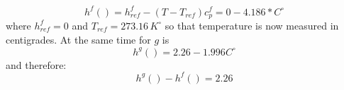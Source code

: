 \begin{equation}
h^f() = h^f_{ref} -(T-T_{ref})c_p^f = 0 - 4.186*  C^\circ   
\end{equation}
where \(h_{ref}^f=0\) and \(T_{ref} = 273.16\, K^\circ\) so that temperature is now measured in centigrades.
At the same time for \(g\) is 
\begin{equation}
h^g( ) = 2.26  - 1.996 C^\circ
\end{equation}
and therefore:
\begin{equation}
h^g()-h^f() = 2.26
\end{equation}